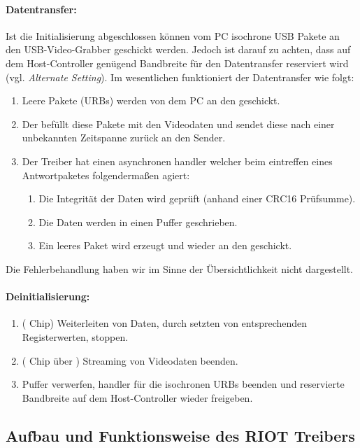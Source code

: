 \paragraph{Datentransfer:} Ist die Initialisierung abgeschlossen können vom PC isochrone USB Pakete an den USB-Video-Grabber
geschickt werden. Jedoch ist darauf zu achten, dass auf dem Host-Controller genügend Bandbreite für den Datentransfer reserviert wird
(vgl. \emph{Alternate Setting}). Im wesentlichen funktioniert der Datentransfer wie folgt:
\begin{enumerate}
 \item Leere Pakete (URBs) werden von dem PC an den \stk{} geschickt.
 \item Der \stk{} befüllt diese Pakete mit den Videodaten und sendet diese nach einer unbekannten Zeitspanne zurück an den Sender.
 \item Der Treiber hat einen asynchronen handler welcher beim eintreffen eines Antwortpaketes folgendermaßen agiert:
 \begin{enumerate}
  \item Die Integrität der Daten wird geprüft (anhand einer CRC16 Prüfsumme).
  \item Die Daten werden in einen Puffer geschrieben.
  \item Ein leeres Paket wird erzeugt und wieder an den \stk{} geschickt. 
 \end{enumerate}
\end{enumerate}
Die Fehlerbehandlung haben wir im Sinne der Übersichtlichkeit nicht dargestellt.

\paragraph{Deinitialisierung:}
\begin{enumerate}
 \item (\stk{} Chip) Weiterleiten von Daten, durch setzten von entsprechenden Registerwerten, stoppen.
 \item (\saa{} Chip über \iic{}) Streaming von Videodaten beenden.
 \item Puffer verwerfen, handler für die isochronen URBs beenden und reservierte Bandbreite auf dem Host-Controller wieder freigeben.
\end{enumerate}

\subsection{Aufbau und Funktionsweise des RIOT Treibers}
